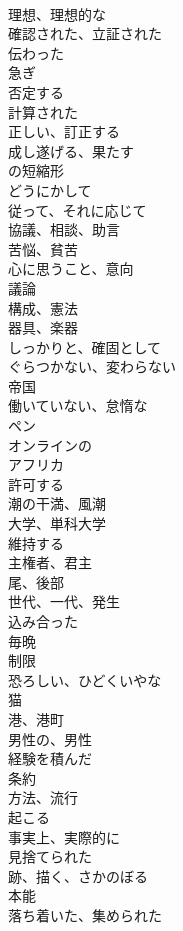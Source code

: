 \documentclass[8pt]{extreport}
\begin{document}
\begin{CJK}{UTF8}{min}
\\	理想、理想的な	
\\	確認された、立証された	
\\	伝わった	
\\	急ぎ	
\\	否定する	
\\	計算された	
\\	正しい、訂正する	
\\	成し遂げる、果たす	
\\	の短縮形	
\\	どうにかして	
\\	従って、それに応じて	
\\	協議、相談、助言	
\\	苦悩、貧苦	
\\	心に思うこと、意向	
\\	議論	
\\	構成、憲法	
\\	器具、楽器	
\\	しっかりと、確固として	
\\	ぐらつかない、変わらない	
\\	帝国	
\\	働いていない、怠惰な	
\\	ペン	
\\	オンラインの	
\\	アフリカ	
\\	許可する	
\\	潮の干満、風潮	
\\	大学、単科大学	
\\	維持する	
\\	主権者、君主	
\\	尾、後部	
\\	世代、一代、発生	
\\	込み合った	
\\	毎晩	
\\	制限	
\\	恐ろしい、ひどくいやな	
\\	猫	
\\	港、港町	
\\	男性の、男性	
\\	経験を積んだ	
\\	条約	
\\	方法、流行	
\\	起こる	
\\	事実上、実際的に	
\\	見捨てられた	
\\	跡、描く、さかのぼる	
\\	本能	
\\	落ち着いた、集められた	

\end{CJK}
\end{document}
